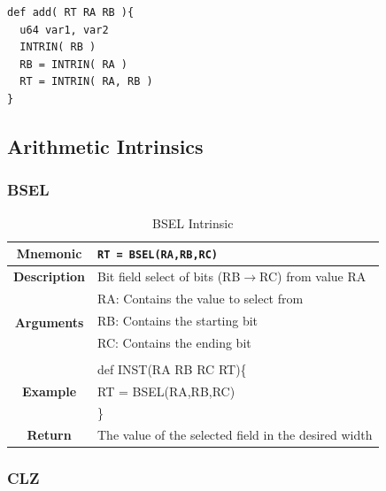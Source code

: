 \documentclass{article}
\begin{document}
\vspace{0.125in}
\begin{lstlisting}[frame=single,style=base,caption={Intrinsic Syntax},captionpos=b,label={lis:intrinsyntax}]
def add( RT RA RB ){
  u64 var1, var2
  INTRIN( RB )
  RB = INTRIN( RA )
  RT = INTRIN( RA, RB )
}
\end{lstlisting}

\clearpage
\subsection{Arithmetic Intrinsics}
\label{sec:ArithIntrinsics}

\subsubsection{BSEL}
\label{sec:BSEL}

\begin{table}[h]
\begin{center}
\caption{BSEL Intrinsic}
\vspace{0.125in}
\label{tab:BSELIntrinsic}
\begin{tabular}{|c|l|}
\hline
\textbf{Mnemonic} & \texttt{RT = BSEL(RA,RB,RC)}\\
\hline
\textbf{Description} & Bit field select of bits (RB$\rightarrow$RC) from value RA\\
\hline
\multirow{4}{*}{\textbf{Arguments}} & RA: Contains the value to select from\\
                                    & RB: Contains the starting bit\\
                                    & RC: Contains the ending bit\\
                          			     & \\
\hline
\multirow{3}{*}{\textbf{Example}} & def INST(RA RB RC RT)\{\\
                          			  &   RT = BSEL(RA,RB,RC)\\
                                                    & \}\\
\hline
\textbf{Return} & The value of the selected field in the desired width\\
\hline
\end{tabular}
\end{center}
\end{table}

\clearpage
\subsubsection{CLZ}
\label{sec:CLZ}
\end{document}
